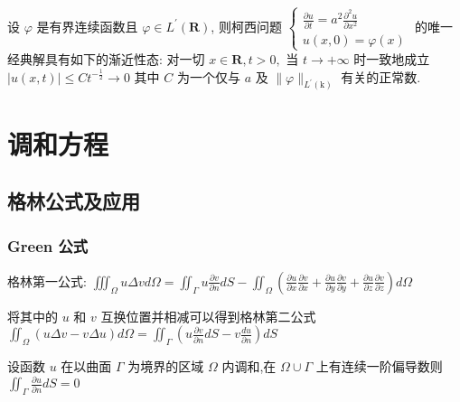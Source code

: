 \documentclass[10pt]{yerbaformat}
\begin{document}
\begin{theorem}[柯西问题解的渐进性态]
    设 $\varphi$ 是有界连续函数且 $\varphi \in L^{\prime}(\mathbf{R})$, 则柯西问题 $\left\{\begin{array}{l}\frac{\partial u}{\partial t}=a^{2} \frac{\partial^{2} u}{\partial x^{2}} \\ u(x, 0)=\varphi(x)\end{array}\right.$ 的唯一经典解具有如下的渐近性态: 对一切 $x \in \mathbf{R}, t>0,$ 当 $t \rightarrow+\infty$ 时一致地成立 $|u(x, t)| \leqslant C t^{-\frac{1}{2}} \rightarrow 0 $ 其中 $C$ 为一个仅与 $a$ 及 $\|\varphi\|_{L^{\prime}(\mathrm{k})}$ 有关的正常数.
\end{theorem}

\section{调和方程}

\subsection{格林公式及应用}
\subsubsection{Green 公式}

\par 格林第一公式: $\iiint_{\Omega} u \Delta v d \Omega =\iint_{\varGamma } u \frac{\partial v}{\partial n} d S-\iint_{\Omega}\left(\frac{\partial u}{\partial x} \frac{\partial v}{\partial x}+\frac{\partial u}{\partial y} \frac{\partial v}{\partial y}+\frac{\partial u}{\partial z} \frac{\partial v}{\partial z}\right) d \Omega$

\par 将其中的 $u$ 和 $v$ 互换位置并相减可以得到格林第二公式 $\iint_{\Omega}(u \Delta v-v \Delta u) d \Omega=\iint_{\Gamma}\left(u \frac{\partial v}{\partial n} d S-v \frac{d u}{\partial n}\right) d S$

\begin{theorem}
    设函数 $u$ 在以曲面 $\Gamma$ 为境界的区域 $\Omega$ 内调和,在 $\Omega \cup \Gamma$ 上有连续一阶偏导数则 $\iint_{\Gamma} \frac{\partial u}{\partial n} d S=0$
\end{theorem}

\end{document}
